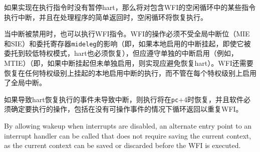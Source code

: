 {\iffalse
\begin{commentary}
If the implementation does not stall the hart on execution of the
instruction, then the interrupt will be taken on some instruction in
the idle loop containing the WFI, and on a simple return from the
handler, the idle loop will resume execution.
\end{commentary}
\fi
\begin{commentary}
如果实现在执行指令时没有暂停hart，那么将对包含WFI的空闲循环中的某些指令执行中断，并且在处理程序的简单返回时，空闲循环将恢复执行。
\end{commentary}

\iffalse
The WFI instruction can also be executed when interrupts are disabled.  The
operation of WFI must be unaffected by the global interrupt bits in {\tt
mstatus} (MIE and SIE) and the delegation register {\tt mideleg}
(i.e., the hart must resume if a locally enabled interrupt becomes pending,
even if it has been delegated to a less-privileged mode), but should honor the
individual interrupt enables (e.g, MTIE) (i.e., implementations should
avoid resuming the hart if the interrupt is pending but not
individually enabled).  WFI is also required to resume execution for
locally enabled interrupts pending at any privilege level, regardless
of the global interrupt enable at each privilege level.

If the event that causes the hart to resume execution does not cause
an interrupt to be taken, execution will resume at {\tt pc} + 4, and
software must determine what action to take, including looping back to
repeat the WFI if there was no actionable event.
\fi
当中断被禁用时，也可以执行WFI指令。WFI的操作必须不受全局中断位（MIE和SIE）和委托寄存器{\tt mideleg}的影响（即，如果本地启用的中断挂起，即使它被委托到较低特权模式，hart也必须恢复），但应遵守单独的中断启用（例如，MTIE）（即，如果中断挂起但未单独启用，则实现应避免恢复hart）。WFI还需要恢复在任何特权级别上挂起的本地启用中断的执行，而不管在每个特权级别上启用了全局中断。

如果导致hart恢复执行的事件未导致中断，则执行将在{\tt pc}+4时恢复，并且软件必须确定要执行的操作，包括在没有可操作事件的情况下循环返回以重复WFI。

\iffalse
\begin{commentary}
By allowing wakeup when interrupts are disabled, an alternate entry
point to an interrupt handler can be called that does not require
saving the current context, as the current context can be saved or
discarded before the WFI is executed.


\end{commentary}}
